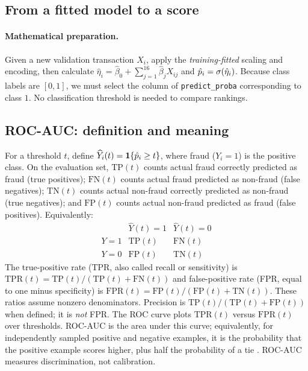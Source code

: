 \documentclass[11pt,a4paper]{article}
\begin{document}
\subsection{From a fitted model to a score}
\paragraph{Mathematical preparation.} Given a new validation transaction $X_i$, apply the \emph{training-fitted} scaling and encoding, then calculate $\hat\eta_i=\hat\beta_0+\sum_{j=1}^{16}\hat\beta_jX_{ij}$ and $\hat p_i=\sigma(\hat\eta_i)$. Because class labels are $[0,1]$, we must select the column of \texttt{predict\_proba} corresponding to class $1$. No classification threshold is needed to compare rankings.

\subsection{ROC-AUC: definition and meaning}
For a threshold $t$, define $\widehat Y_i(t)=\mathbf 1\{\hat p_i\ge t\}$,
where fraud ($Y_i=1$) is the positive class. On the evaluation set,
$\mathrm{TP}(t)$ counts actual fraud correctly predicted as fraud
(true positives); $\mathrm{FN}(t)$ counts actual fraud predicted as
non-fraud (false negatives); $\mathrm{TN}(t)$ counts actual non-fraud
correctly predicted as non-fraud (true negatives); and
$\mathrm{FP}(t)$ counts actual non-fraud predicted as fraud
(false positives). Equivalently:
\[
\begin{array}{c|cc}
 & \widehat Y(t)=1 & \widehat Y(t)=0\\ \hline
Y=1 & \mathrm{TP}(t) & \mathrm{FN}(t)\\
Y=0 & \mathrm{FP}(t) & \mathrm{TN}(t)
\end{array}
\]
 The true-positive rate (TPR, also called recall or sensitivity) is $\mathrm{TPR}(t)=\mathrm{TP}(t)/(\mathrm{TP}(t)+\mathrm{FN}(t))$ and false-positive rate (FPR, equal to one minus specificity) is $\mathrm{FPR}(t)=\mathrm{FP}(t)/(\mathrm{FP}(t)+\mathrm{TN}(t))$. These ratios assume nonzero denominators. Precision is $\mathrm{TP}(t)/(\mathrm{TP}(t)+\mathrm{FP}(t))$ when defined; it is \emph{not} FPR. The ROC curve plots $\mathrm{TPR}(t)$ versus $\mathrm{FPR}(t)$ over thresholds. ROC-AUC is the area under this curve; equivalently, for independently sampled positive and negative examples, it is the probability that the positive example scores higher, plus half the probability of a tie \cite{fawcett2006}. ROC-AUC measures discrimination, not calibration.
\end{document}
